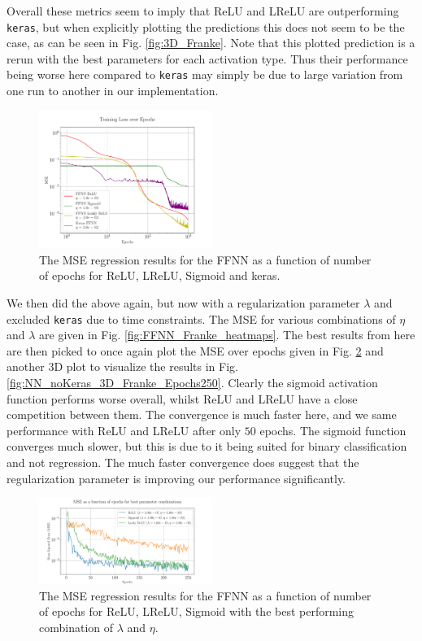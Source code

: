\documentclass[%
reprint,
amsmath,amssymb,
aps,
]{revtex4-2}
\begin{document}
Overall these metrics seem to imply that ReLU and LReLU are outperforming \texttt{keras}, but when explicitly plotting the predictions this does not seem to be the case, as can be seen in Fig. \ref{fig:3D_Franke}. Note that this plotted prediction is a rerun with the best parameters for each activation type. Thus their performance being worse here compared to \texttt{keras} may simply be due to large variation from one run to another in our implementation.
\begin{figure}[ht!]
	\includegraphics[width=0.5\textwidth]{Python/Figures/NN_MSE_Franke_Epoch.pdf}
	\caption{The MSE regression results for the FFNN as a function of number of epochs for ReLU, LReLU, Sigmoid and keras.}
	\label{fig:NN_Franke_Epochs}
\end{figure}

We then did the above again, but now with a regularization parameter $\lambda$ and excluded \texttt{keras} due to time constraints. The MSE for various combinations of $\eta$ and $\lambda$ are given in Fig. \ref{fig:FFNN_Franke_heatmaps}. The best results from here are then picked to once again plot the MSE over epochs given in Fig. \ref{fig:best_MSE_Franke_Epochs} and another 3D plot to visualize the results in Fig. \ref{fig:NN_noKeras_3D_Franke_Epochs250}. Clearly the sigmoid activation function performs worse overall, whilst ReLU and LReLU have a close competition between them. The convergence is much faster here, and we same performance with ReLU and LReLU after only $50$ epochs. The sigmoid function converges much slower, but this is due to it being suited for binary classification and not regression. The much faster convergence does suggest that the regularization parameter is improving our performance significantly.
\begin{figure}[ht!]
	\includegraphics[width=0.5\textwidth]{Python/Figures/Best_MSE_vs_Epochs250.pdf}
	\caption{The MSE regression results for the FFNN as a function of number of epochs for ReLU, LReLU, Sigmoid with the best performing combination of $\lambda$ and $\eta$.}
	\label{fig:best_MSE_Franke_Epochs}
\end{figure}
\end{document}
